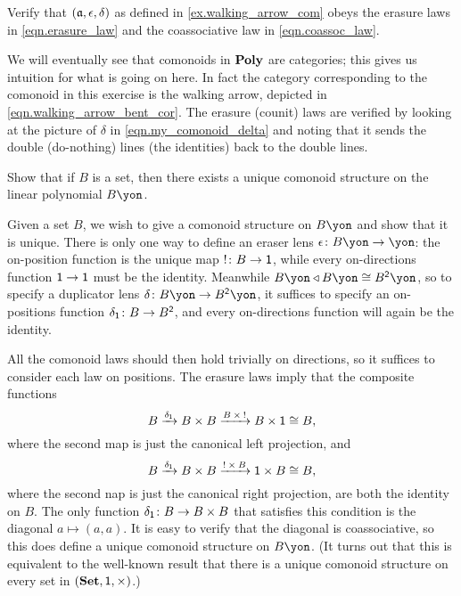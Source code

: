 \documentclass[Book-Poly]{subfiles}
\begin{document}
\begin{exercise} \label{exc.walking_arrow_com}
Verify that $(\mathfrak{a},\epsilon,\delta)$ as defined in \cref{ex.walking_arrow_com} obeys the erasure laws in \eqref{eqn.erasure_law} and the coassociative law in \eqref{eqn.coassoc_law}.
\begin{solution}
We will eventually see that comonoids in $\mathbf{Poly}$ are categories; this gives us intuition for what is going on here. In fact the category corresponding to the comonoid in this exercise is the walking arrow, depicted in \eqref{eqn.walking_arrow_bent_cor}. The erasure (counit) laws are verified by looking at the picture of $\delta$ in \eqref{eqn.my_comonoid_delta} and noting that it sends the double (do-nothing) lines (the identities) back to the double lines.
\end{solution}
\end{exercise}

\begin{exercise}\label{exc.linear_poly_comon}
Show that if $B$ is a set, then there exists a unique comonoid structure on the linear polynomial $B\yon$.
\begin{solution}
Given a set $B$, we wish to give a comonoid structure on $B\yon$ and show that it is unique.
There is only one way to define an eraser lens $\epsilon\colon B\yon\to\yon$: the on-position function is the unique map $!\colon B\to\textsf{1}$, while every on-directions function $\textsf{1}\to\textsf{1}$ must be the identity.
Meanwhile $B\yon\tri B\yon\iso B^\2\yon$, so to specify a duplicator lens $\delta\colon B\yon\to B^\2\yon$, it suffices to specify an on-positions function $\delta_{\textsf{1}}\colon B\to B^{\textsf{2}}$, and every on-directions function will again be the identity.

All the comonoid laws should then hold trivially on directions, so it suffices to consider each law on positions.
The erasure laws imply that the composite functions
\[
    B\xrightarrow{\delta_{\textsf{1}}}B\times B\xrightarrow{B\:\times\:!}B\times\textsf{1}\cong B,
\]
where the second map is just the canonical left projection, and
\[
    B\xrightarrow{\delta_{\textsf{1}}}B\times B\xrightarrow{!\:\times\:B}\textsf{1}\times B\cong B,
\]
where the second nap is just the canonical right projection, are both the identity on $B$.
The only function $\delta_{\textsf{1}}\colon B\to B\times B$ that satisfies this condition is the diagonal $a\mapsto(a,a)$.
It is easy to verify that the diagonal is coassociative, so this does define a unique comonoid structure on $B\yon$.
(It turns out that this is equivalent to the well-known result that there is a unique comonoid structure on every set in $(\mathbf{Set},\textsf{1},\times)$.)
\end{solution}
\end{exercise}
\end{document}
